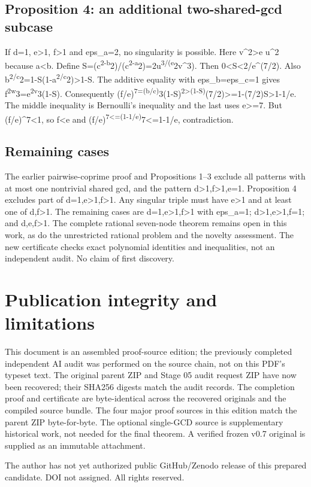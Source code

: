 \documentclass[
  10pt,
]{article}
\begin{document}
\subsection{Proposition 4: an additional two-shared-gcd
subcase}\label{proposition-4-an-additional-two-shared-gcd-subcase}

If d=1, e\textgreater1, f\textgreater1 and eps\_a=2, no singularity is
possible. Here v\^{}2\textgreater e u\^{}2 because a\textless b. Define
S=(c\textsuperscript{2-b}2)/(c\textsuperscript{2-a}2)=2u\textsuperscript{3/(e}2v\^{}3).
Then 0\textless S\textless2/e\^{}(7/2). Also
b\textsuperscript{2/c}2=1-S(1-a\textsuperscript{2/c}2)\textgreater1-S.
The additive equality with eps\_b=eps\_c=1 gives
f\textsuperscript{2w}3=e\textsuperscript{2v}3(1-S). Consequently
(f/e)\textsuperscript{7=(b/c)}3(1-S)\textsuperscript{2\textgreater(1-S)}(7/2)\textgreater=1-(7/2)S\textgreater1-1/e.
The middle inequality is Bernoulli's inequality and the last uses
e\textgreater=7. But (f/e)\^{}7\textless1, so f\textless e and
(f/e)\textsuperscript{7\textless=(1-1/e)}7\textless=1-1/e,
contradiction.

\subsection{Remaining cases}\label{remaining-cases}

The earlier pairwise-coprime proof and Propositions 1--3 exclude all
patterns with at most one nontrivial shared gcd, and the pattern
d\textgreater1,f\textgreater1,e=1. Proposition 4 excludes part of
d=1,e\textgreater1,f\textgreater1. Any singular triple must have
e\textgreater1 and at least one of d,f\textgreater1. The remaining cases
are d=1,e\textgreater1,f\textgreater1 with eps\_a=1;
d\textgreater1,e\textgreater1,f=1; and d,e,f\textgreater1. The complete
rational seven-node theorem remains open in this work, as do the
unrestricted rational problem and the novelty assessment. The new
certificate checks exact polynomial identities and inequalities, not an
independent audit. No claim of first discovery.

\newpage

\section{Publication integrity and
limitations}\label{publication-integrity-and-limitations}

This document is an assembled proof-source edition; the previously
completed independent AI audit was performed on the source chain, not on
this PDF's typeset text. The original parent ZIP and Stage 05 audit
request ZIP have now been recovered; their SHA256 digests match the
audit records. The completion proof and certificate are byte-identical
across the recovered originals and the compiled source bundle. The four
major proof sources in this edition match the parent ZIP byte-for-byte.
The optional single-GCD source is supplementary historical work, not
needed for the final theorem. A verified frozen v0.7 original is
supplied as an immutable attachment.

The author has not yet authorized public GitHub/Zenodo release of this
prepared candidate. DOI not assigned. All rights reserved.
\end{document}
